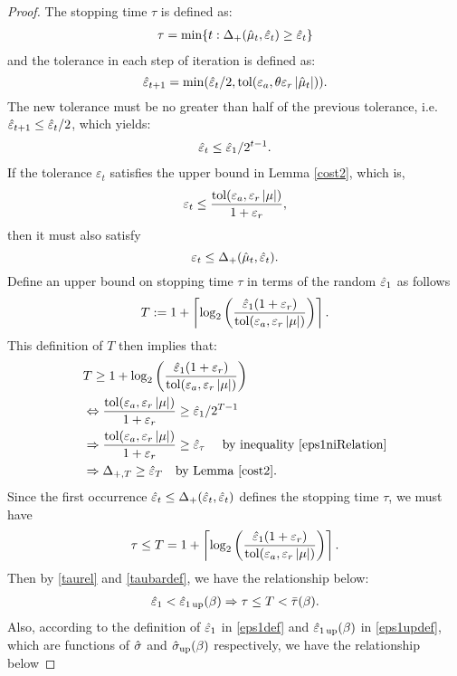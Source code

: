 \documentclass{iitthesis}
\theoremstyle{definition}
\begin{document}
\begin{proof}
The stopping time $\tau$ is defined as:
 \begin{align}\label{st}
\tau = \min \{ t: \Delta_{+}(\hat{\mu}_t, \hat{\varepsilon}_t) \geq \hat{\varepsilon}_t \}
\end{align}
 and the tolerance in each step of iteration is defined as:
 $$\hat{\varepsilon}_{t+1} = \min(\hat{\varepsilon}_t/2, \operatorname{tol}(\varepsilon_a,\theta\varepsilon_r\left \lvert \hat{\mu}_t \right \rvert)).$$ 
The new tolerance must be no greater than half of the previous tolerance, i.e. $\hat{\varepsilon}_{t+1} \leq\hat{\varepsilon}_t/2$, which yields: 
\begin{align}\label{eps1niRelation}
\hat{\varepsilon}_t\le\hat{\varepsilon}_1/2^{t-1}.
\end{align} 
If the tolerance $\varepsilon_t$ satisfies the upper bound in Lemma \ref{cost2}, which is, $$\varepsilon_t \leq \frac{\operatorname{tol}(\varepsilon_a, \varepsilon_r\left \lvert \mu \right \rvert)}{1+\varepsilon_r},$$ then it must also satisfy
$$\varepsilon_t \leq \Delta_{+}(\hat{\mu}_t, \hat{\varepsilon}_t).$$ 
Define an upper bound on stopping time $\tau$ in terms of the random $\hat{\varepsilon}_1$ as follows
$$T := 1+\left \lceil \log_{2} \left(\frac{\hat{\varepsilon}_{1}(1+\varepsilon_r)}{ \operatorname{tol}(\varepsilon_a,\varepsilon_r \left \lvert \mu \right \rvert)}\right) \right \rceil. $$
This definition of $T$ then implies that:
\begin{align*}
& T \geq 1+\log_{2} \left(\frac{\hat{\varepsilon}_{1}(1+\varepsilon_r)}{ \operatorname{tol}(\varepsilon_a,\varepsilon_r \left \lvert \mu \right \rvert)}\right)\\&
\Leftrightarrow  \frac{\operatorname{tol}(\varepsilon_a, \varepsilon_r\left \lvert \mu \right \rvert)}{1+\varepsilon_r} \ge \hat{\varepsilon}_1/2^{T-1}\\
& \Rightarrow \frac{\operatorname{tol}(\varepsilon_a, \varepsilon_r\left \lvert \mu \right \rvert)}{1+\varepsilon_r} \ge \hat{\varepsilon}_\tau  \text{ \quad by inequality \eqref{eps1niRelation}}\\&
\Rightarrow \Delta_{+,T} \ge \hat{\varepsilon}_{T} \text{\quad by Lemma \ref{cost2}}.
\end{align*}
Since the first occurrence $\hat{\varepsilon}_t \leq \Delta_+(\hat{\varepsilon}_t,\hat{\varepsilon}_t)$ defines the stopping time $\tau$, we must have
\begin{align}\label{taurel}
\tau \le T= 1+\left \lceil \log_{2} \left(\frac{\hat{\varepsilon}_{1}(1+\varepsilon_r)}{ \operatorname{tol}(\varepsilon_a,\varepsilon_r \left \lvert \mu \right \rvert)}\right) \right \rceil.
\end{align}
Then by \eqref{taurel} and \eqref{taubardef}, we have the relationship below:
\begin{align} \label{epstau}
 \hat{\varepsilon}_1 <\hat{\varepsilon}_{1\operatorname{up}}(\beta) \Rightarrow \tau \le T<\bar{\tau}(\beta).
\end{align}
Also, according to the definition of $\hat{\varepsilon}_1$ in \eqref{eps1def} and $\hat{\varepsilon}_{1\operatorname{up}}(\beta)$ in \eqref{eps1updef}, which are functions of $\hat{\sigma}$ and $\hat{\sigma}_{\operatorname{up}}(\beta)$ respectively, we have the relationship below

\end{proof}
\end{document}
